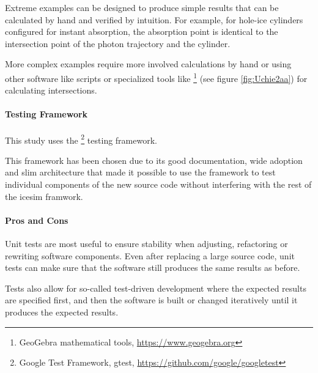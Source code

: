 Extreme examples can be designed to produce simple results that can be calculated by hand and verified by intuition. For example, for hole-ice cylinders configured for instant absorption, the absorption point is identical to the intersection point of the photon trajectory and the cylinder.

More complex examples require more involved calculations by hand or using other software like  scripts or specialized tools like \footnote{GeoGebra mathematical tools, \url{https://www.geogebra.org}} (see figure \ref{fig:Uchie2aa}) for calculating intersections.


\paragraph{Testing Framework}
This study uses the \footnote{Google Test Framework, gtest, \url{https://github.com/google/googletest}} testing framework.

This framework has been chosen due to its good documentation, wide adoption and slim architecture that made it possible to use the framework to test individual components of the new source code without interfering with the rest of the icesim framwork.


\paragraph{Pros and Cons}
Unit tests are most useful to ensure stability when adjusting, refactoring or rewriting software components. Even after replacing a large source code, unit tests can make sure that the software still produces the same results as before.

Tests also allow for so-called test-driven development where the expected results are specified first, and then the software is built or changed iteratively until it produces the expected results.

